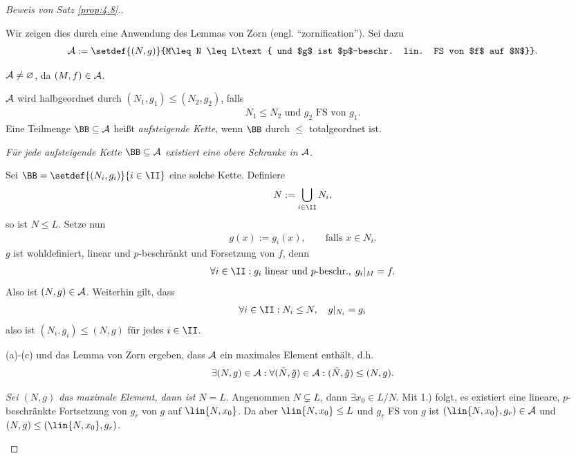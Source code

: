 \begin{proof}[Beweis von Satz \ref{prop:4.8}.]
\begin{proofenum}
Wir zeigen dies durch eine Anwendung des Lemmas von Zorn (engl.
``zornification''). Sei dazu
\begin{align*}
\AA :=
\setdef{(N,g)}{M\leq N \leq L\text{ und $g$ ist $p$-beschr. lin. FS von
$f$ auf $N$}}.
\end{align*}
\begin{defnenum}
  \item $\AA\neq \varnothing$, da $(M,f)\in\AA$.
  \item $\AA$ wird halbgeordnet durch $(N_1,g_1)\le (N_2,g_2)$, falls
\begin{align*}
N_1\le N_2\text{ und } g_2 \text{ FS von } g_1.
\end{align*}
Eine Teilmenge $\BB\subseteq \AA$ heißt \emph{aufsteigende Kette}, wenn $\BB$
durch $\le$ totalgeordnet ist.
\item \textit{Für jede aufsteigende Kette $\BB\subseteq \AA$ existiert eine
obere Schranke in $\AA$}.

Sei $\BB=\setdef{(N_i,g_i)}{i\in\II}$ eine solche Kette. Definiere
\begin{align*}
N:= \bigcup_{i\in\II} N_i,
\end{align*}
so ist $N\leq L$. Setze nun
\begin{align*}
g(x):= g_i(x),\qquad \text{falls } x\in N_i. 
\end{align*}
$g$ ist wohldefiniert, linear und $p$-beschränkt und Forsetzung von $f$, denn
\begin{align*}
\forall i\in\II : g_i\text{ linear und $p$-beschr.},\; g_i|_M = f.
\end{align*}
Also ist $(N,g)\in\AA$. Weiterhin gilt, dass
\begin{align*}
\forall i\in\II : N_i\le N,\quad g|_{N_i} = g_i
\end{align*}
also ist $(N_i,g_i)\le (N,g)$ für jedes $i\in\II$.
\end{defnenum}
(a)-(c) und das Lemma von Zorn ergeben, dass $\AA$ ein maximales Element
enthält, d.h.
\begin{align*}
\exists (N,g)\in \AA : \forall (\tilde{N},\tilde{g})\in \AA :
(\tilde{N},\tilde{g})\le (N,g).
\end{align*}
\item
\textit{Sei $(N,g)$ das maximale Element, dann ist $N=L$}. Angenommen
$N\subsetneq L$, dann $\exists x_0\in L/N$. Mit 1.) folgt, es existiert eine
lineare, $p$-beschränkte Fortsetzung von $g_r$ von $g$ auf $\lin{N,x_0}$. Da
aber $\lin{N,x_0}\le L$ und $g_r$ FS von $g$ ist $(\lin{N,x_0},g_r)\in\AA$ und
$(N,g)\le (\lin{N,x_0},g_r)$.\dipper\qedhere
\end{proofenum}
\end{proof}

